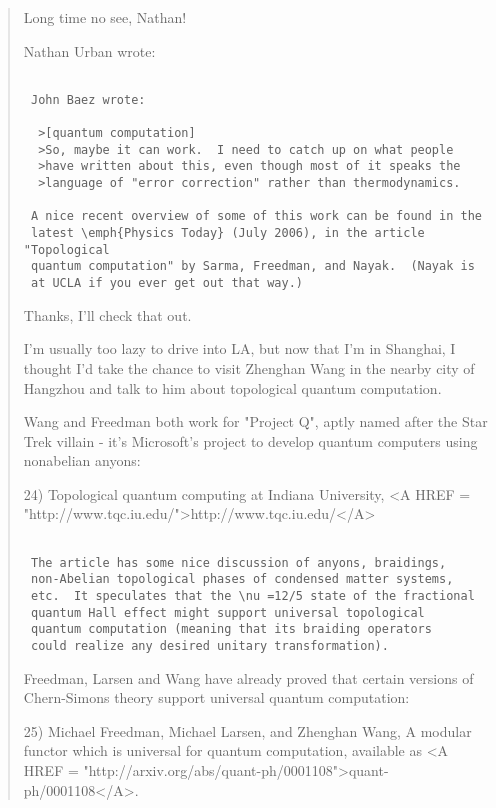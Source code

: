 \begin{quote}
Long time no see, Nathan!

Nathan Urban wrote:


\begin{verbatim}

 John Baez wrote:

  >[quantum computation]
  >So, maybe it can work.  I need to catch up on what people 
  >have written about this, even though most of it speaks the 
  >language of "error correction" rather than thermodynamics.

 A nice recent overview of some of this work can be found in the 
 latest \emph{Physics Today} (July 2006), in the article "Topological 
 quantum computation" by Sarma, Freedman, and Nayak.  (Nayak is 
 at UCLA if you ever get out that way.)
\end{verbatim}
    

Thanks, I'll check that out.

I'm usually too lazy to drive into LA, but now that I'm in Shanghai,
I thought I'd take the chance to visit Zhenghan Wang in the nearby 
city of Hangzhou and talk to him about topological quantum computation.

Wang and Freedman both work for "Project Q", aptly named after the 
Star Trek villain - it's Microsoft's project to develop quantum 
computers using nonabelian anyons:

24) Topological quantum computing at Indiana University, 
<A HREF = "http://www.tqc.iu.edu/">http://www.tqc.iu.edu/</A>


\begin{verbatim}

 The article has some nice discussion of anyons, braidings, 
 non-Abelian topological phases of condensed matter systems, 
 etc.  It speculates that the \nu =12/5 state of the fractional 
 quantum Hall effect might support universal topological 
 quantum computation (meaning that its braiding operators 
 could realize any desired unitary transformation).
\end{verbatim}
    

Freedman, Larsen and Wang have already proved that certain versions of 
Chern-Simons theory support universal quantum computation:

25)  Michael Freedman, Michael Larsen, and Zhenghan Wang, A 
modular functor which is universal for quantum computation, 
available as <A HREF = "http://arxiv.org/abs/quant-ph/0001108">quant-ph/0001108</A>.


\end{quote}
